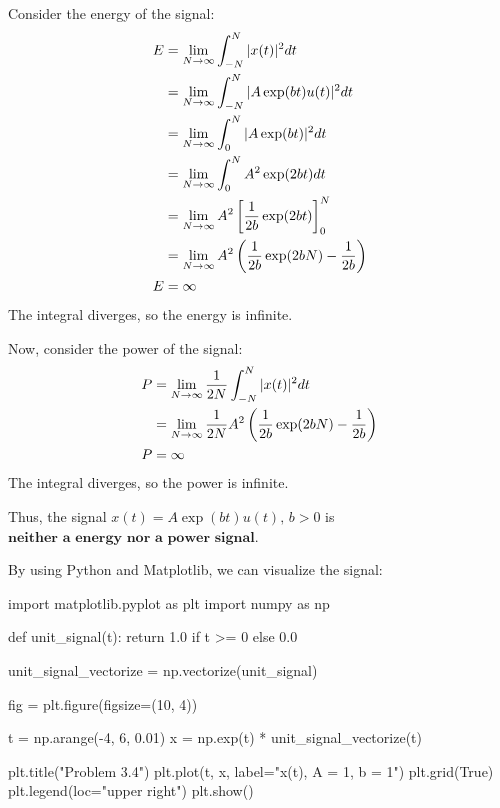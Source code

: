 \documentclass[a4paper, 10pt]{article}
\begin{document}
\begin{solution}
Consider the energy of the signal:
\begin{align*}
    E &= \lim_{N \to \infty} \int_{-N}^{N} |x(t)|^2 dt \\
    &= \lim_{N \to \infty} \int_{-N}^{N} |A\exp(bt)u(t)|^2 dt \\
    &= \lim_{N \to \infty} \int_{0}^{N} |A\exp(bt)|^2 dt \\
    &= \lim_{N \to \infty} \int_{0}^{N} A^2\exp(2bt) dt \\
    &= \lim_{N \to \infty} A^2 \left[ \frac{1}{2b} \exp(2bt) \right]_{0}^{N} \\
    &= \lim_{N \to \infty} A^2 \left( \frac{1}{2b} \exp(2bN) - \frac{1}{2b} \right) \\
    E &= \infty
\end{align*}
The integral diverges, so the energy is infinite.

\vspace{5mm}

Now, consider the power of the signal:
\begin{align*}
    P &= \lim_{N \to \infty} \frac{1}{2N} \int_{-N}^{N} |x(t)|^2 dt \\
    &= \lim_{N \to \infty} \frac{1}{2N} A^2 \left( \frac{1}{2b} \exp(2bN) - \frac{1}{2b} \right) \\
    P &= \infty
\end{align*}
The integral diverges, so the power is infinite.

\vspace{2mm}

Thus, the signal \( x(t) = A\exp(bt)u(t), \,  b > 0 \) is \( \boxed{\textbf{neither a energy nor a power signal}} \).

\vspace{2mm}

By using Python and Matplotlib, we can visualize the signal:
\begin{codingbox}
import matplotlib.pyplot as plt
import numpy as np

def unit_signal(t):
    return 1.0 if t >= 0 else 0.0

unit_signal_vectorize = np.vectorize(unit_signal)

fig = plt.figure(figsize=(10, 4))

t = np.arange(-4, 6, 0.01)
x = np.exp(t) * unit_signal_vectorize(t)

plt.title("Problem 3.4")
plt.plot(t, x, label="x(t), A = 1, b = 1")
plt.grid(True)
plt.legend(loc="upper right")
plt.show()
\end{codingbox}


\end{solution}
\end{document}
